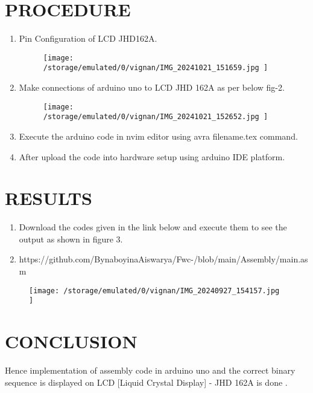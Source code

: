 \documentclass[conference]{IEEEtran}
\begin{document}
\section{PROCEDURE}
 \begin{enumerate}
\item Pin Configuration of LCD JHD162A.

\begin{figure}[h]                           
\centering                                 
\texttt{[image: /storage/emulated/0/vignan/IMG\_20241021\_151659.jpg  ]}                                           
\caption{\label{fig-1:Gates}}               
\end{figure}

\item Make connections of arduino uno to LCD 
JHD 162A as per below fig-2.

\begin{figure}[h]                           
\centering                                 
\texttt{[image:  /storage/emulated/0/vignan/IMG\_20241021\_152652.jpg  ]}                                           
\caption{\label{fig-2:Gates}}               
\end{figure}


\item Execute the arduino code in nvim editor using avra filename.tex command.
\item After upload the code into hardware setup using arduino IDE platform.
 \end{enumerate}

\section{RESULTS}
 \begin{enumerate}
\item Download the codes given in the link below and execute them to see the output as shown in figure 3.
\item https://github.com/BynaboyinaAiswarya/Fwc-/blob/main/Assembly/main.asm
 \end{enumerate}


 \begin{figure}[h]                           
\centering                                 
\texttt{[image:  /storage/emulated/0/vignan/IMG\_20240927\_154157.jpg    ]}                                           
\caption{\label{fig-3:Gates}}               
\end{figure}
\section{CONCLUSION}
Hence implementation of assembly code in arduino uno and the correct binary sequence is displayed on LCD [Liquid Crystal Display] - JHD 162A is done .
\end{document}
